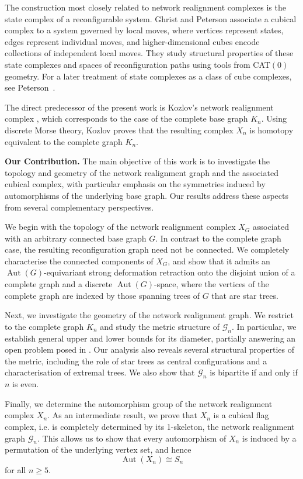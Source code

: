 \documentclass[reqno,dvipsnames]{amsart}
\theoremstyle{plain}
\numberwithin{equation}{section}
\theoremstyle{definition}
\DeclareMathOperator{\Aut}{Aut}
\begin{document}
The construction most closely related to network realignment complexes is the state complex of a reconfigurable system. Ghrist and Peterson \cite{Ghrist07} associate a cubical complex to a system governed by local moves, where vertices represent states, edges represent individual moves, and higher-dimensional cubes encode collections of independent local moves. They study structural properties of these state complexes and spaces of reconfiguration paths using tools from CAT$(0)$ geometry. For a later treatment of state complexes as a class of cube complexes, see Peterson~\cite{Peterson15}.

The direct predecessor of the present work is Kozlov's network realignment complex \cite{Kozlov25}, which corresponds to the case of the complete base graph $K_n$. Using discrete Morse theory, Kozlov proves that the resulting complex $X_n$ is homotopy equivalent to the complete graph $K_n$.

\bigskip

\noindent\textbf{Our Contribution.} The main objective of this work is to investigate the topology and geometry of the network realignment graph and the associated cubical complex, with particular emphasis on the symmetries induced by automorphisms of the underlying base graph. Our results address these aspects from several complementary perspectives.

We begin with the topology of the network realignment complex $X_G$ associated with an arbitrary connected base graph $G$. In contrast to the complete graph case, the resulting reconfiguration graph need not be connected. We completely characterise the connected components of $X_G$, and show that it admits an $\Aut(G)$-equivariant strong deformation retraction onto the disjoint union of a complete graph and a discrete $\Aut(G)$-space, where the vertices of the complete graph are indexed by those spanning trees of $G$ that are star trees.

Next, we investigate the geometry of the network realignment graph. We restrict to the complete graph $K_n$ and study the metric structure of $\mathcal{G}_n$. In particular, we establish general upper and lower bounds for its diameter, partially answering an open problem posed in \cite{Kozlov25}. Our analysis also reveals several structural properties of the metric, including the role of star trees as central configurations and a characterisation of extremal trees. We also show that $\mathcal{G}_n$ is bipartite if and only if $n$ is even.

Finally, we determine the automorphism group of the network realignment complex $X_n$. As an intermediate result, we prove that $X_n$ is a cubical flag complex, i.e. is completely determined by its 1-skeleton, the network realignment graph $\mathcal{G}_n$. This allows us to show that every automorphism of $X_n$ is induced by a permutation of the underlying vertex set, and hence
\[
\Aut(X_n)\cong S_n
\]
for all $n\geq 5$.
\end{document}
